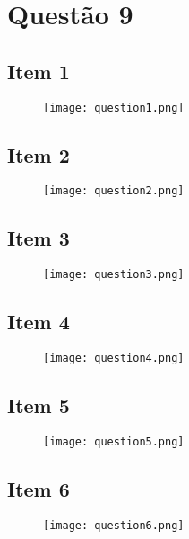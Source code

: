 \documentclass{article}[twocolumn]
\begin{document}
	\section{Quest\~ao 9}
	\subsection{Item 1}
	\begin{figure}[H]
		\centering
		\texttt{[image: question1.png]}
	\end{figure}
	\subsection{Item 2}
	\begin{figure}[H]
		\centering
		\texttt{[image: question2.png]}
	\end{figure}
	\subsection{Item 3}
	\begin{figure}[H]
		\centering
		\texttt{[image: question3.png]}
	\end{figure}
	\subsection{Item 4}
	\begin{figure}[H]
		\centering
		\texttt{[image: question4.png]}
	\end{figure}
	\subsection{Item 5}
	\begin{figure}[H]
		\centering
		\texttt{[image: question5.png]}
	\end{figure}
	\subsection{Item 6}
	\begin{figure}[H]
		\centering
		\texttt{[image: question6.png]}
	\end{figure}
\end{document}
